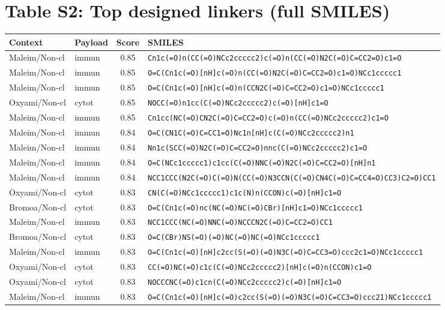 \documentclass[10pt]{article}
\begin{document}
\section{Table S2: Top designed linkers (full SMILES)}
\begin{longtable}{l l c p{9cm}}\toprule
Context & Payload & Score & SMILES \\ \midrule\endhead
Maleim/Non-cl & immun & 0.85 & \texttt{Cn1c(=O)n(CC(=O)NCc2ccccc2)c(=O)n(CC(=O)N2C(=O)C=CC2=O)c1=O} \\
Maleim/Non-cl & immun & 0.85 & \texttt{O=C(Cn1c(=O)[nH]c(=O)n(CC(=O)N2C(=O)C=CC2=O)c1=O)NCc1ccccc1} \\
Maleim/Non-cl & immun & 0.85 & \texttt{O=C(Cn1c(=O)[nH]c(=O)n(CCN2C(=O)C=CC2=O)c1=O)NCc1ccccc1} \\
Oxyami/Non-cl & cytot & 0.85 & \texttt{NOCC(=O)n1cc(C(=O)NCc2ccccc2)c(=O)[nH]c1=O} \\
Maleim/Non-cl & immun & 0.85 & \texttt{Cn1cc(NC(=O)CN2C(=O)C=CC2=O)c(=O)n(CC(=O)NCc2ccccc2)c1=O} \\
Maleim/Non-cl & immun & 0.84 & \texttt{O=C(CN1C(=O)C=CC1=O)Nc1n[nH]c(C(=O)NCc2ccccc2)n1} \\
Maleim/Non-cl & immun & 0.84 & \texttt{Nn1c(SCC(=O)N2C(=O)C=CC2=O)nnc(C(=O)NCc2ccccc2)c1=O} \\
Maleim/Non-cl & immun & 0.84 & \texttt{O=C(NCc1ccccc1)c1cc(C(=O)NNC(=O)N2C(=O)C=CC2=O)[nH]n1} \\
Maleim/Non-cl & immun & 0.84 & \texttt{NCC1CCC(N2C(=O)C(=O)N(CC(=O)N3CCN(C(=O)CN4C(=O)C=CC4=O)CC3)C2=O)CC1} \\
Oxyami/Non-cl & cytot & 0.83 & \texttt{CN(C(=O)NCc1ccccc1)c1c(N)n(CCON)c(=O)[nH]c1=O} \\
Bromoa/Non-cl & cytot & 0.83 & \texttt{O=C(Cn1c(=O)nc(NC(=O)NC(=O)CBr)[nH]c1=O)NCc1ccccc1} \\
Maleim/Non-cl & immun & 0.83 & \texttt{NCC1CCC(NC(=O)NNC(=O)NCCCN2C(=O)C=CC2=O)CC1} \\
Bromoa/Non-cl & cytot & 0.83 & \texttt{O=C(CBr)NS(=O)(=O)NC(=O)NC(=O)NCc1ccccc1} \\
Maleim/Non-cl & immun & 0.83 & \texttt{O=C(Cn1c(=O)[nH]c2cc(S(=O)(=O)N3C(=O)C=CC3=O)ccc2c1=O)NCc1ccccc1} \\
Oxyami/Non-cl & cytot & 0.83 & \texttt{CC(=O)NC(=O)c1c(C(=O)NCc2ccccc2)[nH]c(=O)n(CCON)c1=O} \\
Oxyami/Non-cl & cytot & 0.83 & \texttt{NOCCCNC(=O)c1cn(C(=O)NCc2ccccc2)c(=O)[nH]c1=O} \\
Maleim/Non-cl & immun & 0.83 & \texttt{O=C(Cn1c(=O)[nH]c(=O)c2cc(S(=O)(=O)N3C(=O)C=CC3=O)ccc21)NCc1ccccc1} \\

\end{longtable}
\end{document}
